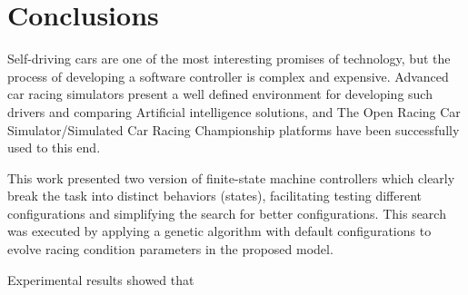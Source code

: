 \section{Conclusions}\label{sec:5}
Self-driving cars are one of the most interesting promises of technology, but the process of developing a software controller is complex and expensive. Advanced car racing simulators present a well defined environment for developing such drivers and comparing Artificial intelligence solutions, and The Open Racing Car Simulator/Simulated Car Racing Championship platforms have been successfully used to this end.

This work presented two version of finite-state machine controllers which clearly break the task into distinct behaviors (states), facilitating testing different configurations and simplifying the search for better configurations. This search was executed by applying a genetic algorithm with default configurations to evolve racing condition parameters in the proposed model.

Experimental results showed that





